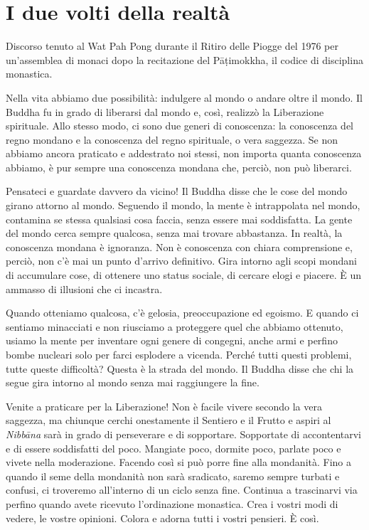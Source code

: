 \chapter{I due volti della realtà}

\begin{openingQuote}
  \centering

  Discorso tenuto al Wat Pah Pong durante il Ritiro delle Piogge del 1976 per
  un'assemblea di monaci dopo la recitazione del Pāṭimokkha, il codice di
  disciplina monastica.
\end{openingQuote}

Nella vita abbiamo due possibilità: indulgere al mondo o andare oltre il
mondo. Il Buddha fu in grado di liberarsi dal mondo e, così, realizzò la
Liberazione spirituale. Allo stesso modo, ci sono due generi di
conoscenza: la conoscenza del regno mondano e la conoscenza del regno
spirituale, o vera saggezza. Se non abbiamo ancora praticato e
addestrato noi stessi, non importa quanta conoscenza abbiamo, è pur
sempre una conoscenza mondana che, perciò, non può liberarci.

Pensateci e guardate davvero da vicino! Il Buddha disse che le cose del
mondo girano attorno al mondo. Seguendo il mondo, la mente è
intrappolata nel mondo, contamina se stessa qualsiasi cosa faccia, senza
essere mai soddisfatta. La gente del mondo cerca sempre qualcosa, senza
mai trovare abbastanza. In realtà, la conoscenza mondana è ignoranza.
Non è conoscenza con chiara comprensione e, perciò, non c'è mai un punto
d'arrivo definitivo. Gira intorno agli scopi mondani di accumulare cose,
di ottenere uno status sociale, di cercare elogi e piacere. È un ammasso
di illusioni che ci incastra.

Quando otteniamo qualcosa, c'è gelosia, preoccupazione ed egoismo. E
quando ci sentiamo minacciati e non riusciamo a proteggere quel che
abbiamo ottenuto, usiamo la mente per inventare ogni genere di congegni,
anche armi e perfino bombe nucleari solo per farci esplodere a vicenda.
Perché tutti questi problemi, tutte queste difficoltà? Questa è la
strada del mondo. Il Buddha disse che chi la segue gira intorno al mondo
senza mai raggiungere la fine.

Venite a praticare per la Liberazione! Non è facile vivere secondo la
vera saggezza, ma chiunque cerchi onestamente il Sentiero e il Frutto e
aspiri al \emph{Nibbāna} sarà in grado di perseverare e di sopportare.
Sopportate di accontentarvi e di essere soddisfatti del poco. Mangiate
poco, dormite poco, parlate poco e vivete nella moderazione. Facendo
così si può porre fine alla mondanità. Fino a quando il seme della
mondanità non sarà sradicato, saremo sempre turbati e confusi, ci
troveremo all'interno di un ciclo senza fine. Continua a trascinarvi via
perfino quando avete ricevuto l'ordinazione monastica. Crea i vostri
modi di vedere, le vostre opinioni. Colora e adorna tutti i vostri
pensieri. È così.

